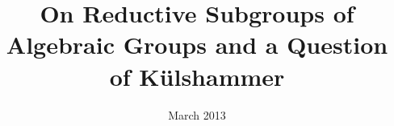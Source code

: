 \documentclass[a4paper, 11pt, oneside]{Thesis}  %
\begin{document}
\frontmatter	  %

\title  {On Reductive Subgroups of Algebraic Groups and a Question of K\"ulshammer}
\addresses  {\groupname\\\deptname\\\univname}  %
\date       {March 2013}
\subject    {}
\keywords   {}

\maketitle


\fancyhead{}  %
\rhead{\thepage}  %
\lhead{}  %

\pagestyle{fancy}  %
\end{document}
